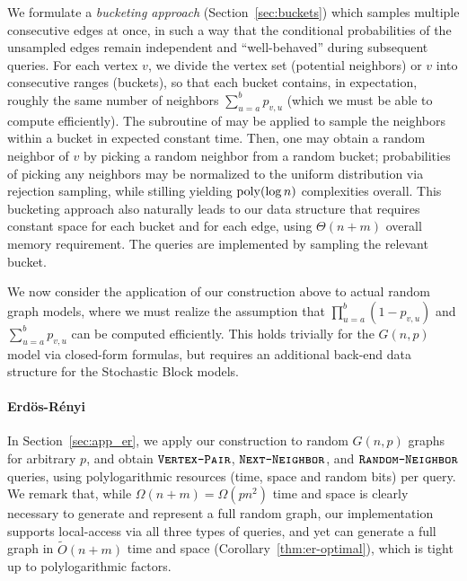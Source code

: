 We formulate a {\em bucketing approach} (Section~\ref{sec:buckets})
which samples multiple consecutive edges at once, in such a way
that the conditional probabilities of the unsampled edges
remain independent and ``well-behaved'' during subsequent queries.
For each vertex $v$, we divide the vertex set (potential neighbors) or $v$ into consecutive ranges (buckets),
so that each bucket contains, in expectation, roughly the same number of neighbors
$\sum^{b}_{u=a} p_{v,u}$ (which we must be able to compute efficiently).
The subroutine of  may be applied to sample the neighbors within a bucket in expected constant time.
Then, one may obtain a random neighbor of $v$ by picking a random neighbor from a random bucket;
probabilities of picking any neighbors may be normalized to the uniform distribution via rejection sampling,
while stilling yielding $\mathrm{poly}(\log n)$ complexities overall.
This bucketing approach also naturally leads to our data structure that requires
constant space for each bucket and for each edge, using $\Theta(n+m)$ overall memory requirement.
The  queries are implemented by sampling the relevant bucket.

We now consider the application of our construction above to actual random graph models,
where we must realize the assumption that $\prod^{b}_{u=a} (1-p_{v,u})$
and $\sum^{b}_{u=a} p_{v,u}$ can be computed efficiently.
This holds trivially for the $G(n,p)$ model via closed-form formulas,
but requires an additional back-end data structure for the Stochastic Block models.

\paragraph*{Erd\"{o}s-R\'{e}nyi}
\label{par:erdos_renyi}
In Section~\ref{sec:app_er}, we apply our construction to random $G(n,p)$ graphs for
arbitrary $p$, and obtain
$\texttt{\textsc{Vertex-Pair}}$, $\texttt{\textsc{Next-Neighbor}}$, and $\texttt{\textsc{Random-Neighbor}}$ queries,
using polylogarithmic resources (time, space and random bits) per query.
We remark that, while $\Omega(n+m) = \Omega(p n^2)$ time and space
is clearly necessary to generate and represent a full random graph,
our implementation supports local-access via all three types of queries, 
and yet can generate a full graph in $\widetilde{O}(n+m)$ time and space (Corollary~\ref{thm:er-optimal}),
which is tight up to polylogarithmic factors.


